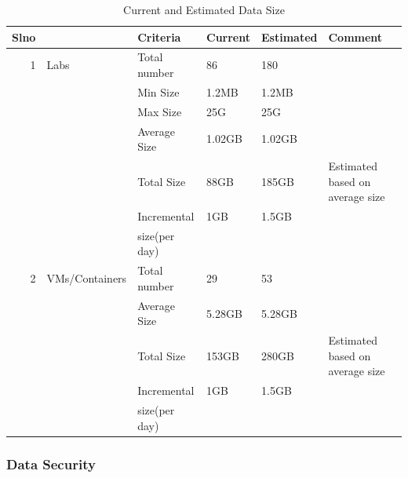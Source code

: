 \documentclass[11pt]{article}
\begin{document}
\begin{table}[H]
\caption{\label{tbl: Data Size Estimates}Current and Estimated Data Size}
\begin{center}
\begin{tabular}{rlllll}
\hline
 Slno  &                  &  Criteria       &  Current  &  Estimated  &  Comment                          \\
\hline
    1  &  Labs            &  Total number   &  86       &  180        &                                   \\
       &                  &  Min Size       &  1.2MB    &  1.2MB      &                                   \\
       &                  &  Max Size       &  25G      &  25G        &                                   \\
       &                  &  Average Size   &  1.02GB   &  1.02GB     &                                   \\
       &                  &  Total Size     &  88GB     &  185GB      &  Estimated based on average size  \\
       &                  &  Incremental    &  1GB      &  1.5GB      &                                   \\
       &                  &  size(per day)  &           &             &                                   \\
\hline
    2  &  VMs/Containers  &  Total number   &  29       &  53         &                                   \\
       &                  &  Average Size   &  5.28GB   &  5.28GB     &                                   \\
       &                  &  Total Size     &  153GB    &  280GB      &  Estimated based on average size  \\
       &                  &  Incremental    &  1GB      &  1.5GB      &                                   \\
       &                  &  size(per day)  &           &             &                                   \\
\hline
\end{tabular}
\end{center}
\end{table}

\subsubsection{Data Security}
\label{sec-8.3.3}
\end{document}
